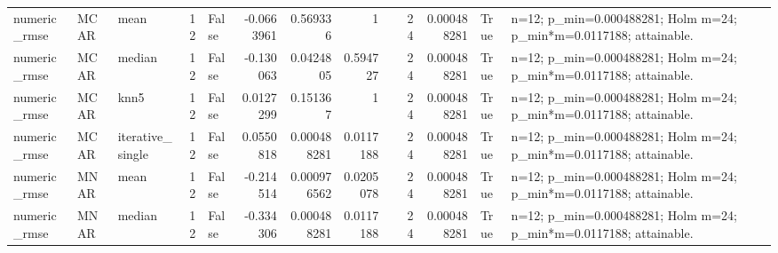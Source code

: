 \begin{table}[ht]
\begin{tabular}{lllrlrrrlrrll}
 numeric\_rmse           & MCAR        & mean             &           12 & False               &      -0.0663961  & 0.569336    & 1         &                                                                                                                    &                             24 &                        0.000488281 & True                        & n=12; p\_min=0.000488281; Holm m=24; p\_min*m=0.0117188; attainable. \\
 numeric\_rmse           & MCAR        & median           &           12 & False               &      -0.130063   & 0.0424805   & 0.594727  &                                                                                                                    &                             24 &                        0.000488281 & True                        & n=12; p\_min=0.000488281; Holm m=24; p\_min*m=0.0117188; attainable. \\
 numeric\_rmse           & MCAR        & knn5             &           12 & False               &       0.0127299  & 0.151367    & 1         &                                                                                                                    &                             24 &                        0.000488281 & True                        & n=12; p\_min=0.000488281; Holm m=24; p\_min*m=0.0117188; attainable. \\
 numeric\_rmse           & MCAR        & iterative\_single &           12 & False               &       0.0550818  & 0.000488281 & 0.0117188 &                                                                                                                    &                             24 &                        0.000488281 & True                        & n=12; p\_min=0.000488281; Holm m=24; p\_min*m=0.0117188; attainable. \\
 numeric\_rmse           & MNAR        & mean             &           12 & False               &      -0.214514   & 0.000976562 & 0.0205078 &                                                                                                                    &                             24 &                        0.000488281 & True                        & n=12; p\_min=0.000488281; Holm m=24; p\_min*m=0.0117188; attainable. \\
 numeric\_rmse           & MNAR        & median           &           12 & False               &      -0.334306   & 0.000488281 & 0.0117188 &                                                                                                                    &                             24 &                        0.000488281 & True                        & n=12; p\_min=0.000488281; Holm m=24; p\_min*m=0.0117188; attainable. \\

\end{tabular}
\end{table}

